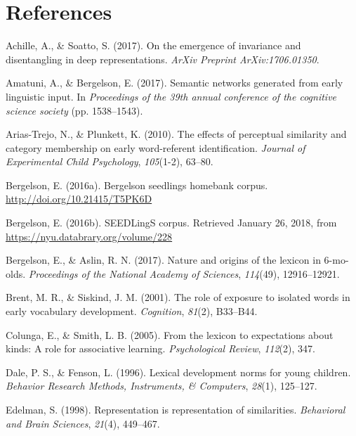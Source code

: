 \documentclass[10pt, letterpaper]{article}
\begin{document}
\section{References}\label{references}

\setlength{\parindent}{-0.1in} \setlength{\leftskip}{0.125in} \noindent

\hypertarget{refs}{}
\hypertarget{ref-achille2017emergence}{}
Achille, A., \& Soatto, S. (2017). On the emergence of invariance and
disentangling in deep representations. \emph{ArXiv Preprint
ArXiv:1706.01350}.

\hypertarget{ref-amatuni2017semantic}{}
Amatuni, A., \& Bergelson, E. (2017). Semantic networks generated from
early linguistic input. In \emph{Proceedings of the 39th annual
conference of the cognitive science society} (pp. 1538--1543).

\hypertarget{ref-arias2010effects}{}
Arias-Trejo, N., \& Plunkett, K. (2010). The effects of perceptual
similarity and category membership on early word-referent
identification. \emph{Journal of Experimental Child Psychology},
\emph{105}(1-2), 63--80.

\hypertarget{ref-bergelson2016seedlings}{}
Bergelson, E. (2016a). Bergelson seedlings homebank corpus.
\url{http://doi.org/10.21415/T5PK6D}

\hypertarget{ref-bergelson2016seedlingsdatabrary}{}
Bergelson, E. (2016b). SEEDLingS corpus. Retrieved January 26, 2018,
from \url{https://nyu.databrary.org/volume/228}

\hypertarget{ref-bergelson2017nature}{}
Bergelson, E., \& Aslin, R. N. (2017). Nature and origins of the lexicon
in 6-mo-olds. \emph{Proceedings of the National Academy of Sciences},
\emph{114}(49), 12916--12921.

\hypertarget{ref-brent2001role}{}
Brent, M. R., \& Siskind, J. M. (2001). The role of exposure to isolated
words in early vocabulary development. \emph{Cognition}, \emph{81}(2),
B33--B44.

\hypertarget{ref-colunga2005lexicon}{}
Colunga, E., \& Smith, L. B. (2005). From the lexicon to expectations
about kinds: A role for associative learning. \emph{Psychological
Review}, \emph{112}(2), 347.

\hypertarget{ref-dale1996lexical}{}
Dale, P. S., \& Fenson, L. (1996). Lexical development norms for young
children. \emph{Behavior Research Methods, Instruments, \& Computers},
\emph{28}(1), 125--127.

\hypertarget{ref-edelman1998representation}{}
Edelman, S. (1998). Representation is representation of similarities.
\emph{Behavioral and Brain Sciences}, \emph{21}(4), 449--467.
\end{document}

